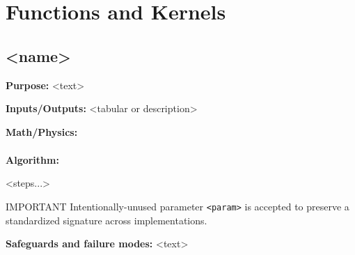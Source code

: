 \section{Functions and Kernels}

\subsection{<name>}
\textbf{Purpose:} <text>

\textbf{Inputs/Outputs:} <tabular or description>

\textbf{Math/Physics:}
\begin{align}
\end{align}

\textbf{Algorithm:}
\begin{algorithm}[H]
\DontPrintSemicolon
{}
\BlankLine
<steps...>\;
\caption{<name>}
\end{algorithm}

\begin{admonition}{IMPORTANT}
Intentionally-unused parameter \texttt{<param>} is accepted to preserve a standardized signature across implementations.
\end{admonition}

\textbf{Safeguards and failure modes:} <text>